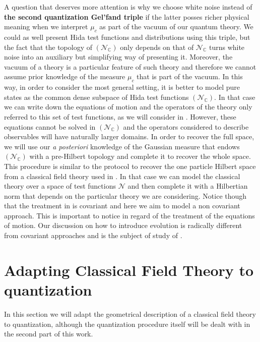 \documentclass{elsarticle}%
\begin{document}
    A question that deserves more attention is why we choose white noise instead of  \textbf{the second quantization Gel'fand triple} if the latter posses richer physical meaning when we interpret $\mu_c$ as part of the vacuum of our quantum theory.   We could as well present Hida test functions and distributions using this triple, but the fact that the topology of $(\mathcal{N}_{\mathbb{C}})$ only depends on that of $\mathcal{N}_{\mathbb{C}}$ turns  white noise into an auxiliary but simplifying way of presenting it. Moreover, the vacuum of a theory is a particular feature of such theory and therefore we cannot assume prior knowledge of the measure $\mu_c$ that is part of the vacuum. In this way, in order to consider the most general setting, it is better to model pure states as the common dense subspace of Hida test functions $(\mathcal{N}_{\mathbb{C}})$. In that case we can write down the equations of motion and the operators of the theory only referred to this set of test functions, as we will consider in \cite{alonsoGeometricFlavours2024}.  However, these equations cannot be solved in  $(\mathcal{N}_{\mathbb{C}})$ and the operators considered to describe observables will have naturally larger domains. In order to recover the full space, we will use our \textit{ a posteriori} knowledge of the  Gaussian measure that endows $(\mathcal{N}_{\mathbb{C}})$ with a pre-Hilbert topology and complete it to recover the whole space.  This procedure is similar to the protocol to recover the one particle Hilbert space from a classical field theory used in \cite{waldQuantumField1994}. In that case we can model the classical theory over a space of test functions $\mathcal{N}$ and then complete it  with a Hilbertian norm that depends on the particular theory we are considering. Notice though that the treatment in \cite{waldQuantumField1994} is covariant and here we aim to model a non covariant approach. This is important to notice in regard of the treatment of the equations of motion. Our discussion on how to introduce evolution is radically different from covariant approaches and is the subject of study of  \cite{alonsoGeometricFlavours2024}.

\section{Adapting Classical Field Theory to quantization}
\label{sec:CFTQuantizar}

In this section we will adapt  the geometrical description of a classical field theory to quantization, although the quantization procedure itself will be dealt with in the second part \cite{alonsoGeometricFlavours2024} of this work.
 
\end{document}
